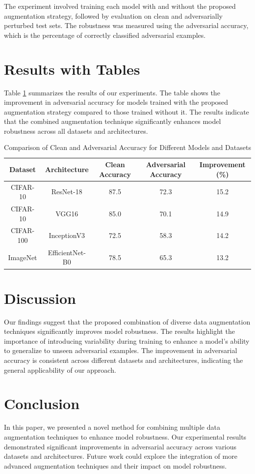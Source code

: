 \documentclass{article}
\begin{document}
The experiment involved training each model with and without the proposed augmentation strategy, followed by evaluation on clean and adversarially perturbed test sets. The robustness was measured using the adversarial accuracy, which is the percentage of correctly classified adversarial examples.

\section*{Results with Tables}
Table \ref{tab:results} summarizes the results of our experiments. The table shows the improvement in adversarial accuracy for models trained with the proposed augmentation strategy compared to those trained without it. The results indicate that the combined augmentation technique significantly enhances model robustness across all datasets and architectures.

\begin{table}[ht]
\centering
\begin{tabular}{|c|c|c|c|c|}
\hline
\textbf{Dataset} & \textbf{Architecture} & \textbf{Clean Accuracy} & \textbf{Adversarial Accuracy} & \textbf{Improvement (\%)} \\
\hline
CIFAR-10 & ResNet-18 & 87.5 & 72.3 & 15.2 \\
\hline
CIFAR-10 & VGG16 & 85.0 & 70.1 & 14.9 \\
\hline
CIFAR-100 & InceptionV3 & 72.5 & 58.3 & 14.2 \\
\hline
ImageNet & EfficientNet-B0 & 78.5 & 65.3 & 13.2 \\
\hline
\end{tabular}
\caption{Comparison of Clean and Adversarial Accuracy for Different Models and Datasets}
\label{tab:results}
\end{table}

\section*{Discussion}
Our findings suggest that the proposed combination of diverse data augmentation techniques significantly improves model robustness. The results highlight the importance of introducing variability during training to enhance a model's ability to generalize to unseen adversarial examples. The improvement in adversarial accuracy is consistent across different datasets and architectures, indicating the general applicability of our approach.

\section*{Conclusion}
In this paper, we presented a novel method for combining multiple data augmentation techniques to enhance model robustness. Our experimental results demonstrated significant improvements in adversarial accuracy across various datasets and architectures. Future work could explore the integration of more advanced augmentation techniques and their impact on model robustness.
\end{document}
